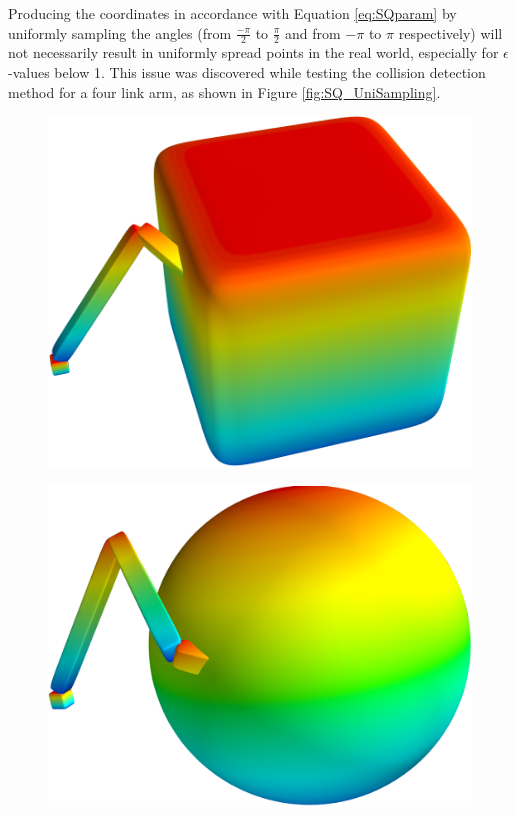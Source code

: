 Producing the coordinates in accordance with Equation \ref{eq:SQparam} by uniformly sampling the angles (from $\frac{-\pi}{2}$ to $\frac{\pi}{2}$ and from  $-\pi$ to $\pi$ respectively) will not necessarily result in uniformly spread points in the real world, especially for $\epsilon$-values below 1. This issue was discovered while testing the collision detection method for a four link arm, as shown in Figure \ref{fig:SQ_UniSampling}. 

\begin{figure}[h]
	\centering
	\begin{minipage}[h]{0.3\textwidth}
		\includegraphics[width=1\textwidth]{import/SQ_ObsBox_Collision}
		\label{fig:SQ_ObsBoxCol}
	\end{minipage}
	\hspace{1cm}
	\begin{minipage}[h]{0.3\textwidth}
		\includegraphics[width=1\textwidth]{import/SQ_ObsSphere_Collision}

\end{minipage}
\end{figure}
